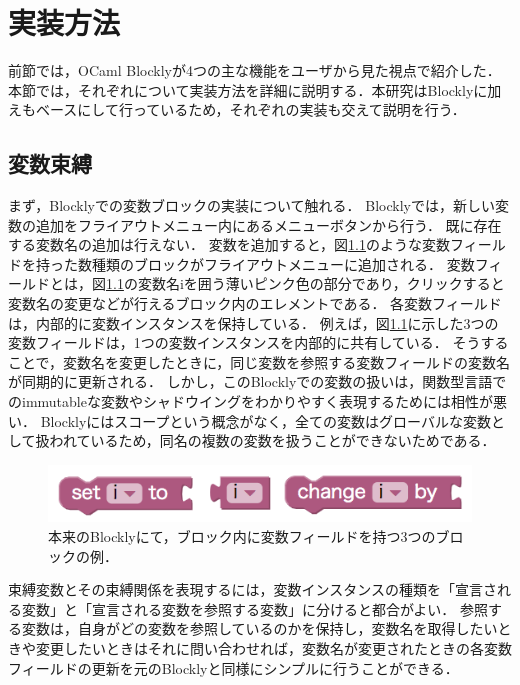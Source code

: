 \chapter{実装方法}\label{chap:impl}

前節では，OCaml Blocklyが4つの主な機能をユーザから見た視点で紹介した．
本節では，それぞれについて実装方法を詳細に説明する．本研究はBlocklyに加え\cite{Typed-Blockly}もベースにして行っているため，それぞれの実装も交えて説明を行う．

\section {変数束縛\label{impl:boundVariable}}

まず，Blocklyでの変数ブロックの実装について触れる．
Blocklyでは，新しい変数の追加をフライアウトメニュー内にあるメニューボタンから行う．
既に存在する変数名の追加は行えない．
変数を追加すると，図\ref{fig:blocklyVar}のような変数フィールドを持った数種類のブロックがフライアウトメニューに追加される．
変数フィールドとは，図\ref{fig:blocklyVar}の変数名iを囲う薄いピンク色の部分であり，クリックすると変数名の変更などが行えるブロック内のエレメントである．
各変数フィールドは，内部的に変数インスタンスを保持している．
例えば，図\ref{fig:blocklyVar}に示した3つの変数フィールドは，1つの変数インスタンスを内部的に共有している．
そうすることで，変数名を変更したときに，同じ変数を参照する変数フィールドの変数名が同期的に更新される．
しかし，このBlocklyでの変数の扱いは，関数型言語でのimmutableな変数やシャドウイングをわかりやすく表現するためには相性が悪い．
Blocklyにはスコープという概念がなく，全ての変数はグローバルな変数として扱われているため，同名の複数の変数を扱うことができないためである．

\begin{figure}[h]
 \centering
 \includegraphics[keepaspectratio, scale=0.3]{img/iVar.png}
 \caption{本来のBlocklyにて，ブロック内に変数フィールドを持つ3つのブロックの例．\label{fig:blocklyVar}}
\end{figure}

束縛変数とその束縛関係を表現するには，変数インスタンスの種類を「宣言される変数」と「宣言される変数を参照する変数」に分けると都合がよい．
参照する変数は，自身がどの変数を参照しているのかを保持し，変数名を取得したいときや変更したいときはそれに問い合わせれば，変数名が変更されたときの各変数フィールドの更新を元のBlocklyと同様にシンプルに行うことができる．

